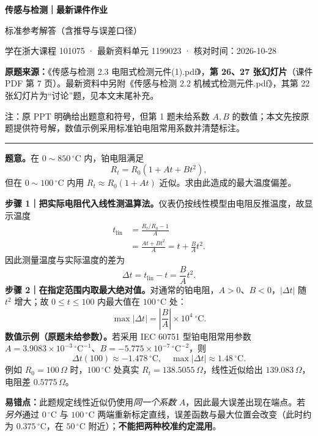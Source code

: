 \documentclass[11pt,a4paper,fontset=none]{ctexart}
\newcommand{\stitle}[1]{\needspace{6\baselineskip}\vspace{8pt}{\noindent\Large\bfseries\color{navy}#1\color{black}}\par\vspace{4pt}\hrule\vspace{8pt}}
\begin{document}
\begin{center}
{\Huge\bfseries\color{navy}传感与检测｜最新课件作业}\par\vspace{5pt}
{\Large 标准参考解答（含推导与误差口径）}\par\vspace{7pt}
{\small\color{muted}学在浙大课程 101075 · 最新资料单元 1199023 · 核对时间：2026-10-28}\par
\end{center}
\vspace{5pt}
\noindent\textbf{原题来源：}《传感与检测 2.3 电阻式检测元件(1).pdf》，\textbf{第 26、27 张幻灯片}（课件 PDF 第 7 页）。最新资料中另附《传感与检测 2.2 机械式检测元件.pdf》，其第 22 张幻灯片为“讨论”题，见本文末尾补充。

\noindent\textcolor{muted}{\small 注：原 PPT 明确给出题意和符号，但第 1 题未给系数 $A,B$ 的数值；本文先按原题提供符号解，数值示例采用标准铂电阻常用系数并清楚标注。}

\stitle{第 1 题　铂电阻线性化导致的温度误差}
\textbf{题意。}在 $0\sim850\,^\circ\mathrm C$ 内，铂电阻满足
\[
R_t=R_0\left(1+At+Bt^2\right),
\]
但在 $0\sim100\,^\circ\mathrm C$ 内用 $R_t\approx R_0(1+At)$ 近似。求由此造成的最大温度偏差。

\textbf{步骤 1｜把实际电阻代入线性测温算法。}仪表仍按线性模型由电阻反推温度，故显示温度
\begin{align*}
t_{\mathrm{lin}}&=\frac{R_t/R_0-1}{A}\\
&=\frac{At+Bt^2}{A}=t+\frac{B}{A}t^2.
\end{align*}
因此测量温度与实际温度的差为
\[
\Delta t=t_{\mathrm{lin}}-t=\frac{B}{A}t^2.
\]
\textbf{步骤 2｜在指定范围内取最大绝对值。}对通常的铂电阻，$A>0$、$B<0$，$|\Delta t|$ 随 $t^2$ 增大；故 $0\le t\le100$ 内最大值在 $100\,^\circ\mathrm C$ 处：
\[
\boxed{\max |\Delta t|=\left|\frac{B}{A}\right|\times10^4\ {^\circ\mathrm C}.}
\]
\textbf{数值示例（原题未给参数）。}若采用 IEC 60751 型铂电阻常用参数 $A=3.9083\times10^{-3}\,\mathrm{^\circ C^{-1}}$、$B=-5.775\times10^{-7}\,\mathrm{^\circ C^{-2}}$，则
\[
\boxed{\Delta t(100)\approx-1.478\,^\circ\mathrm C,\quad \max|\Delta t|\approx1.48\,^\circ\mathrm C.}
\]
例如 $R_0=100\,\Omega$ 时，$100\,^\circ\mathrm C$ 处真实 $R_t=138.5055\,\Omega$，线性近似给出 $139.083\,\Omega$，电阻差 $0.5775\,\Omega$。

\noindent\textbf{易错点：}此题规定线性近似仍使用\emph{同一个系数} $A$，因此最大误差出现在端点。若\emph{另外}通过 $0\,^\circ\mathrm C$ 与 $100\,^\circ\mathrm C$ 两端重新标定直线，误差函数与最大位置会改变（此时约为 $0.375\,^\circ\mathrm C$，在 $50\,^\circ\mathrm C$ 附近）；\textbf{不能把两种校准约定混用}。
\end{document}
